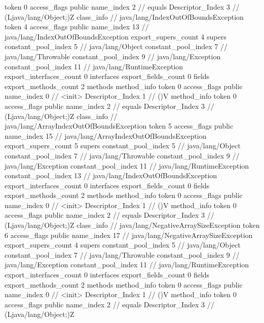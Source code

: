{{{{{					token	0
					access_flags	public
					name_index	2		// equals
					Descriptor_Index	3		// (Ljava/lang/Object;)Z
				}
			}
		}
		class_info {		// java/lang/IndexOutOfBoundsException
			token	4
			access_flags	public
			name_index	13		// java/lang/IndexOutOfBoundsException
			export_supers_count	4
			supers {
				constant_pool_index	5		// java/lang/Object
				constant_pool_index	7		// java/lang/Throwable
				constant_pool_index	9		// java/lang/Exception
				constant_pool_index	11		// java/lang/RuntimeException
			}
			export_interfaces_count	0
			interfaces {
			}
			export_fields_count	0
			fields {
			}
			export_methods_count	2
			methods {
				method_info {
					token	0
					access_flags	public
					name_index	0		// <init>
					Descriptor_Index	1		// ()V
				}
				method_info {
					token	0
					access_flags	public
					name_index	2		// equals
					Descriptor_Index	3		// (Ljava/lang/Object;)Z
				}
			}
		}
		class_info {		// java/lang/ArrayIndexOutOfBoundsException
			token	5
			access_flags	public
			name_index	15		// java/lang/ArrayIndexOutOfBoundsException
			export_supers_count	5
			supers {
				constant_pool_index	5		// java/lang/Object
				constant_pool_index	7		// java/lang/Throwable
				constant_pool_index	9		// java/lang/Exception
				constant_pool_index	11		// java/lang/RuntimeException
				constant_pool_index	13		// java/lang/IndexOutOfBoundsException
			}
			export_interfaces_count	0
			interfaces {
			}
			export_fields_count	0
			fields {
			}
			export_methods_count	2
			methods {
				method_info {
					token	0
					access_flags	public
					name_index	0		// <init>
					Descriptor_Index	1		// ()V
				}
				method_info {
					token	0
					access_flags	public
					name_index	2		// equals
					Descriptor_Index	3		// (Ljava/lang/Object;)Z
				}
			}
		}
		class_info {		// java/lang/NegativeArraySizeException
			token	6
			access_flags	public
			name_index	17		// java/lang/NegativeArraySizeException
			export_supers_count	4
			supers {
				constant_pool_index	5		// java/lang/Object
				constant_pool_index	7		// java/lang/Throwable
				constant_pool_index	9		// java/lang/Exception
				constant_pool_index	11		// java/lang/RuntimeException
			}
			export_interfaces_count	0
			interfaces {
			}
			export_fields_count	0
			fields {
			}
			export_methods_count	2
			methods {
				method_info {
					token	0
					access_flags	public
					name_index	0		// <init>
					Descriptor_Index	1		// ()V
				}
				method_info {
					token	0
					access_flags	public
					name_index	2		// equals
					Descriptor_Index	3		// (Ljava/lang/Object;)Z
				}
			}
		}
}}
